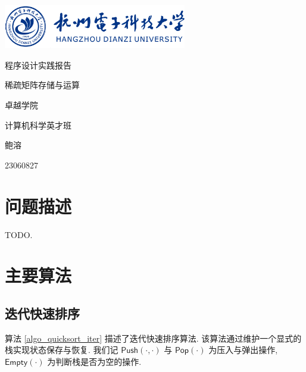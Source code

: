 \documentclass[a4paper]{article}
\begin{document}
\begin{titlepage}


\parbox[c]{8cm}{
    \includegraphics[width=8cm]{hdu.png}
}

\setlength{\parindent}{0pt}
\centering
\vfill
{ \heiti \textcolor{xblue}{程序设计实践报告}\par}
\vspace{10pt}
{ \heiti 稀疏矩阵存储与运算\par}
\vfill
{\large \heiti 卓越学院\par
计算机科学英才班\par
鲍溶\par
23060827\par
}
\vfill
\restoregeometry

\end{titlepage}

\renewcommand\contentsname{\textcolor{xblue}{目录}}
    \tableofcontents
\clearpage
\setcounter{page}{1}

\section{问题描述}

TODO.

\section{主要算法}

\subsection{迭代快速排序}

算法 \ref{algo_quicksort_iter} 描述了迭代快速排序算法. 该算法通过维护一个显式的栈实现状态保存与恢复. 我们记 $\mathsf{Push}(\cdot, \cdot)$ 与 $\mathsf{Pop}(\cdot)$ 为压入与弹出操作, $\mathsf{Empty}(\cdot)$ 为判断栈是否为空的操作.
\end{document}
